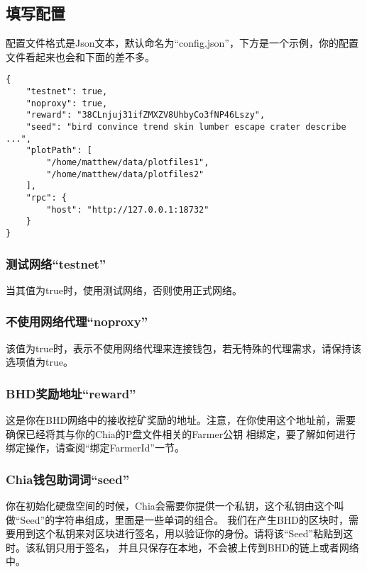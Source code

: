 \begin{flushleft}
\subsection{填写配置}
\begin{flushleft}
    配置文件格式是Json文本，默认命名为``config.json''，下方是一个示例，你的配置文件看起来也会和下面的差不多。
\end{flushleft}
\scriptsize
\begin{verbatim}
{
    "testnet": true,
    "noproxy": true,
    "reward": "38CLnjuj31ifZMXZV8UhbyCo3fNP46Lszy",
    "seed": "bird convince trend skin lumber escape crater describe ...",
    "plotPath": [
        "/home/matthew/data/plotfiles1",
        "/home/matthew/data/plotfiles2"
    ],
    "rpc": {
        "host": "http://127.0.0.1:18732"
    }
}
\end{verbatim}
\normalsize
\subsubsection{测试网络``testnet''}
\begin{flushleft}
    当其值为true时，使用测试网络，否则使用正式网络。
\end{flushleft}
\subsubsection{不使用网络代理``noproxy''}
\begin{flushleft}
    该值为true时，表示不使用网络代理来连接钱包，若无特殊的代理需求，请保持该选项值为true。
\end{flushleft}
\subsubsection{BHD奖励地址``reward''}
\begin{flushleft}
    这是你在BHD网络中的接收挖矿奖励的地址。注意，在你使用这个地址前，需要确保已经将其与你的Chia的P盘文件相关的Farmer公钥
    相绑定，要了解如何进行绑定操作，请查阅``绑定FarmerId''一节。
\end{flushleft}
\subsubsection{Chia钱包助词词``seed''}
\begin{flushleft}
    你在初始化硬盘空间的时候，Chia会需要你提供一个私钥，这个私钥由这个叫做``Seed''的字符串组成，里面是一些单词的组合。
    我们在产生BHD的区块时，需要用到这个私钥来对区块进行签名，用以验证你的身份。请将该``Seed''粘贴到这时。该私钥只用于签名，
    并且只保存在本地，不会被上传到BHD的链上或者网络中。
\end{flushleft}

\end{flushleft}
